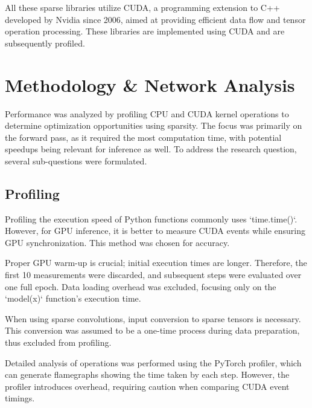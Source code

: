 \documentclass{article}
\begin{document}
All these sparse libraries utilize CUDA, a programming extension to C++ developed by Nvidia since 2006, aimed at providing efficient data flow and tensor operation processing. These libraries are implemented using CUDA and are subsequently profiled.

\section{Methodology \& Network Analysis}
\label{Methodology}

Performance was analyzed by profiling CPU and CUDA kernel operations to determine optimization opportunities using sparsity. The focus was primarily on the forward pass, as it required the most computation time, with potential speedups being relevant for inference as well. To address the research question, several sub-questions were formulated.

\subsection{Profiling}

Profiling the execution speed of Python functions commonly uses `time.time()`. However, for GPU inference, it is better to measure CUDA events while ensuring GPU synchronization. This method was chosen for accuracy.

Proper GPU warm-up is crucial; initial execution times are longer. Therefore, the first 10 measurements were discarded, and subsequent steps were evaluated over one full epoch. Data loading overhead was excluded, focusing only on the `model(x)` function's execution time.

When using sparse convolutions, input conversion to sparse tensors is necessary. This conversion was assumed to be a one-time process during data preparation, thus excluded from profiling.

Detailed analysis of operations was performed using the PyTorch profiler, which can generate flamegraphs showing the time taken by each step. However, the profiler introduces overhead, requiring caution when comparing CUDA event timings.
\end{document}
